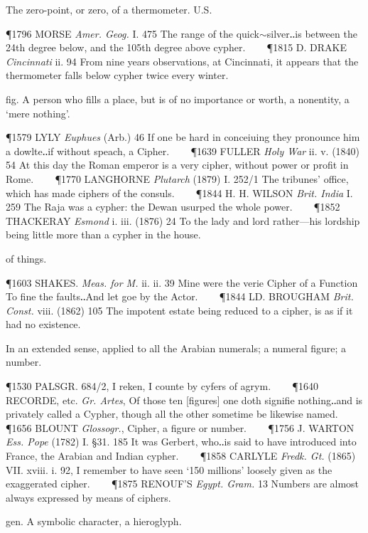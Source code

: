 \begin{description}[wide, labelwidth=!, labelindent=0pt]
\begin{myenumerate}
 The zero-point, or zero, of a thermometer. U.S.

\P 1796 MORSE  \textit{Amer. Geog.} I. 475 The range of the quick$\sim$silver‥is between the 24th degree below, and the 105th degree above cypher.    
\P 1815 D. DRAKE  \textit{Cincinnati} ii. 94 From nine years observations, at Cincinnati, it appears that the thermometer falls below cypher twice every winter.

 fig.  A person who fills a place, but is of no importance or worth, a nonentity, a ‘mere nothing’.

\P 1579 LYLY  \textit{Euphues} (Arb.) 46 If one be hard in conceiuing they pronounce him a dowlte‥if without speach, a Cipher.    
\P 1639 FULLER  \textit{Holy War} ii. v. (1840) 54 At this day the Roman emperor is a very cipher, without power or profit in Rome.    
\P 1770 LANGHORNE  \textit{Plutarch} (1879) I. 252/1 The tribunes' office, which has made ciphers of the consuls.    
\P 1844 H. H. WILSON  \textit{Brit. India} I. 259 The Raja was a cypher: the Dewan usurped the whole power.    
\P 1852 THACKERAY  \textit{Esmond} i. iii. (1876) 24 To the lady and lord rather—his lordship being little more than a cypher in the house.

 of things.

\P 1603 SHAKES.  \textit{Meas. for M.} ii. ii. 39 Mine were the verie Cipher of a Function To fine the faults‥And let goe by the Actor.    
\P 1844 LD. BROUGHAM  \textit{Brit. Const.} viii. (1862) 105 The impotent estate being reduced to a cipher, is as if it had no existence.

 In an extended sense, applied to all the Arabian numerals; a numeral figure; a number.

\P 1530 PALSGR. 684/2, I reken, I counte by cyfers of agrym.    
\P 1640 RECORDE, etc. \textit{Gr. Artes}, Of those ten [figures] one doth signifie nothing‥and is privately called a Cypher, though all the other sometime be likewise named.    
\P 1656 BLOUNT  \textit{Glossogr.}, Cipher, a figure or number.    
\P 1756 J. WARTON  \textit{Ess. Pope} (1782) I. §31. 185 It was Gerbert, who‥is said to have introduced into France, the Arabian and Indian cypher.    
\P 1858 CARLYLE  \textit{Fredk. Gt.} (1865) VII. xviii. i. 92, I remember to have seen ‘150 millions’ loosely given as the exaggerated cipher.    
\P 1875 RENOUF'S  \textit{Egypt. Gram.} 13 Numbers are almost always expressed by means of ciphers.

 gen. A symbolic character, a hieroglyph.


\end{myenumerate}
\end{description}
